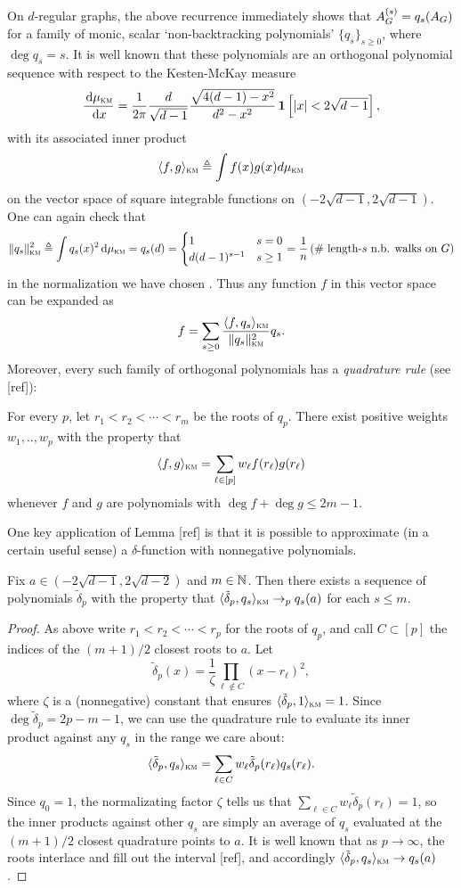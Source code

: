 On $d$-regular graphs, the above recurrence immediately shows that $A^{(s)}_{G} = q_s(A_{G})$ for a family of monic, scalar `non-backtracking polynomials' $\{q_s\}_{s\ge 0}$, where $\deg q_s = s$. It is well known that these polynomials are an orthogonal polynomial sequence with respect to the Kesten-McKay measure
\[
	\frac{\,\textup{d}\mu_{\textsc{km}}}{\,\textup{d} x} = \frac{1}{2\pi} \frac{d}{\sqrt{d-1}} \frac{\sqrt{4(d-1) - x^2}}{d^2 - x^2}\,\boldsymbol{1} \left[ {|x|< 2\sqrt{d-1}} \right],
\]
with its associated inner product 
$$
    \langle f,g \rangle_{\textsc{km}} \triangleq \int f(x)g(x) d\mu_{\textsc{km}}
$$
on the vector space of square integrable functions on $(-2\sqrt{d-1},2\sqrt{d-1})$. One can again check that
\[
	\|q_s\|_{\textsc{km}}^2 \triangleq \int q_s(x)^2\,\textup{d}\mu_{\textsc{km}} = q_s(d) =  \begin{cases} 1 & s = 0 \\ d(d-1)^{s-1} & s \ge 1 \end{cases} = \frac{1}{n}\left(\text{\# length-$s$ n.b. walks on $G$}\right)
\]
in the normalization we have chosen \cite{alon2007non}. Thus any function $f$ in this vector space can be expanded as
$$
    f = \sum_{s \ge 0} \frac{\langle f, q_s \rangle_{\textsc{km}}}{\|q_s\|^2_{\textsc{km}}} q_s.
$$
Moreover, every such family of orthogonal polynomials has a \emph{quadrature rule} (see [ref]):
\begin{lemma}
    For every $p$, let $r_1 < r_2 < \cdots < r_m$ be the roots of $q_p$. There exist positive weights $w_1,..,w_p$ with the property that
    $$
        \langle f,g \rangle_{\textsc{km}} = \sum_{\ell\in[p]} w_\ell f(r_\ell)g(r_\ell)
    $$
    whenever $f$ and $g$ are polynomials with $\deg f + \deg g \le 2m - 1$. 
\end{lemma}
\noindent One key application of Lemma [ref] is that it is possible to approximate (in a certain useful sense) a $\delta$-function with nonnegative polynomials.
\begin{lemma}
    Fix $a \in (-2\sqrt{d-1},2\sqrt{d-2})$ and $m \in \mathbb{N}$. Then there exists a sequence of polynomials $\tilde \delta_p$ with the property that $\langle \tilde \delta_p, q_s \rangle_{\textsc{km}} \to_p q_s(a)$ for each $s \le m$. 
\end{lemma}
\begin{proof}
    As above write $r_1 < r_2 < \cdots < r_p$ for the roots of $q_p$, and call $C \subset [p]$ the indices of the $(m + 1)/2$ closest roots to $a$. Let
    $$
        \tilde\delta_p(x) = \frac{1}{\zeta}\prod_{\ell \notin C} (x - r_\ell)^2,
    $$
    where $\zeta$ is a (nonnegative) constant that ensures $\langle \tilde \delta_p, 1 \rangle_{\textsc{km}} = 1$. Since $\deg \tilde\delta_p = 2p - m - 1$, we can use the quadrature rule to evaluate its inner product against any $q_s$ in the range we care about:
    $$
        \langle \tilde\delta_p, q_s \rangle_{\textsc{km}} = \sum_{\ell \in C} w_\ell\tilde\delta_p(r_\ell) q_s(r_\ell).
    $$
    Since $q_0 = 1$, the normalizating factor $\zeta$ tells us that $\sum_{\ell \in C} w_\ell \tilde\delta_p(r_\ell) = 1$, so the inner products against other $q_s$ are simply an average of $q_s$ evaluated at the $(m + 1)/2$ closest quadrature points to $a$. It is well known that as $p\to \infty$, the roots interlace and fill out the interval [ref], and accordingly $\langle \tilde \delta_p, q_s \rangle_{\textsc{km}} \to q_s(a)$.
\end{proof}

